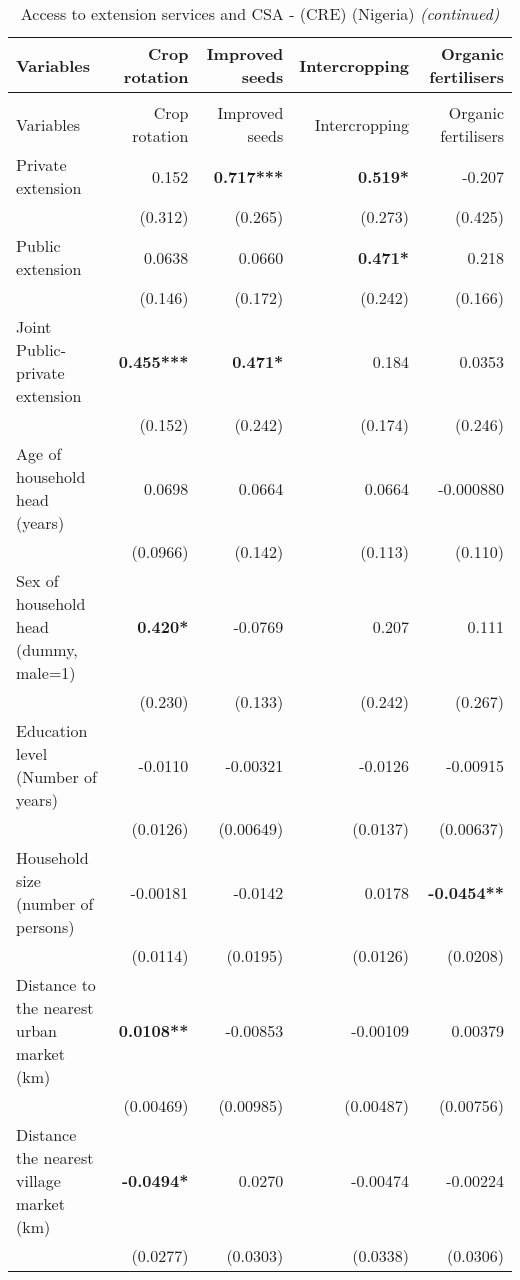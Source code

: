 \documentclass[
]{article}
\begin{document}
\begingroup\fontsize{7}{9}\selectfont

\begin{longtable}[t]{lrrrr}
\caption{\label{tab:unnamed-chunk-6}Access to extension services and CSA - (CRE) (Nigeria)}\\
\toprule
Variables & Crop rotation & Improved seeds & Intercropping & Organic fertilisers\\
\midrule
\endfirsthead
\caption[]{\label{tab:unnamed-chunk-6}Access to extension services and CSA - (CRE) (Nigeria) \textit{(continued)}}\\
\toprule
Variables & Crop rotation & Improved seeds & Intercropping & Organic fertilisers\\
\midrule
\endhead

\endfoot
\bottomrule
\endlastfoot
Private extension & 0.152 & \textbf{0.717***} & \textbf{0.519*} & -0.207\\
 & (0.312) & (0.265) & (0.273) & (0.425)\\
Public extension & 0.0638 & 0.0660 & \textbf{0.471*} & 0.218\\
 & (0.146) & (0.172) & (0.242) & (0.166)\\
Joint Public-private extension & \textbf{0.455***} & \textbf{0.471*} & 0.184 & 0.0353\\
 & (0.152) & (0.242) & (0.174) & (0.246)\\
Age of household head (years) & 0.0698 & 0.0664 & 0.0664 & -0.000880\\
 & (0.0966) & (0.142) & (0.113) & (0.110)\\
Sex of household head (dummy, male=1) & \textbf{0.420*} & -0.0769 & 0.207 & 0.111\\
 & (0.230) & (0.133) & (0.242) & (0.267)\\
Education level (Number of years) & -0.0110 & -0.00321 & -0.0126 & -0.00915\\
 & (0.0126) & (0.00649) & (0.0137) & (0.00637)\\
Household size (number of persons) & -0.00181 & -0.0142 & 0.0178 & \textbf{-0.0454**}\\
 & (0.0114) & (0.0195) & (0.0126) & (0.0208)\\
Distance to the nearest urban market (km) & \textbf{0.0108**} & -0.00853 & -0.00109 & 0.00379\\
 & (0.00469) & (0.00985) & (0.00487) & (0.00756)\\
Distance the nearest village market (km) & \textbf{-0.0494*} & 0.0270 & -0.00474 & -0.00224\\
 & (0.0277) & (0.0303) & (0.0338) & (0.0306)\\

\end{longtable}
\end{document}
